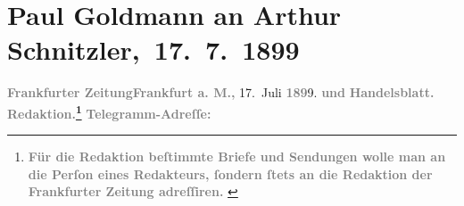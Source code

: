 

         
         \renewcommand{\erwaehntePersonen}{Personen: Hermann Bahr, Max Eugen Burckhard, Paul Goldmann, Rémy de Gourmont, Gisela Hajek, Heinrich Kanner, Louise Schnitzler}
         \renewcommand{\erwaehnteInstitutionen}{Institutionen: Burgtheater, Die Zeit. Wiener Wochenschrift, Frankfurter Zeitung, Neues Wiener Tagblatt, Wiener Rundschau, Österreichische Volks-Zeitung}
         \renewcommand{\erwaehnteOrte}{Orte: Frankfurt am Main, Paris, Velden am Wörthersee, Wien}
         \renewcommand{\erwaehnteWerke}{}
               \section[ Paul Goldmann an Arthur Schnitzler, 17. 7. 1899]{ Paul Goldmann an Arthur Schnitzler, 17. 7. 1899}\nopagebreak{}\rehead{ }\begin{ledgroupsized}[t]{13cm}\normalsize\beginnumbering{} \toendnotes[C]{\smallbreak\pagebreak[2]} 
\toendnotes[C]{\smallbreak}\pstart
           \noindent{}{\pb}\textcolor{gray}{\textbf{\textbf{Frankfurter Zeitung}}}\hfill \textcolor{gray}{\textbf{\textbf{Frankfurt a. M.,}}}{ }17. Juli \textcolor{gray}{\textbf{189}}9.\pend
           \pstart
           \textcolor{gray}{\textbf{und}}\pend
           \pstart
           \textcolor{gray}{\textbf{Handelsblatt.}}\pend
           \pstart
           \textcolor{gray}{\textbf{\textbf{Redaktion.}\footnote{\noindent{}\textcolor{gray}{\textbf{Für die Redaktion beſtimmte Briefe und Sendungen wolle man
                                  an die Perſon eines Redakteurs,
                              ſondern ſtets \textbf{an die Redaktion der Frankfurter Zeitung} adreſſiren. }}}}}\pend
           \pstart
           \textcolor{gray}{\textbf{Telegramm-Adreſſe:}}\pend
           \pstart

\end{ledgroupsized}
